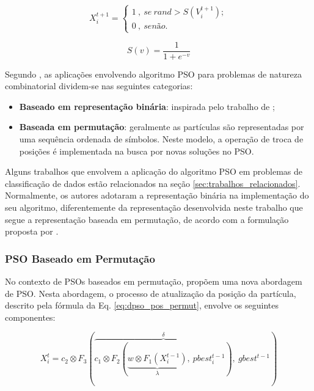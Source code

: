 \documentclass[
	12pt,				%
	openany,			%
	oneside,	
	a4paper,			%
	brazil,				%
	]{unimontes-ppgmsc-abntex2}
\begin{document}
\begin{equation}
\label{eq:dpso_pos_bin}
X^{t+1}_{i} = \left\{\begin{array}{l}
1\ ,\ se\ rand > S(V^{t+1}_{i}); \\
0\ ,\ senão.
\end{array}\right.
\end{equation}

\begin{equation}
\label{eq:dpso_sig}
S(v) = \frac{1}{1 + e^{-v}}
\end{equation}

Segundo , as aplicações envolvendo algoritmo PSO para problemas de natureza combinatorial dividem-se nas seguintes categorias: 

\begin{itemize}
\item \textbf{Baseado em representação binária}: inspirada pelo trabalho de ;
\item \textbf{Baseada em permutação}: geralmente as partículas são representadas por uma sequência ordenada de símbolos. Neste modelo, a operação de troca de posições é implementada na busca por novas soluções no PSO.
\end{itemize}

Alguns trabalhos que envolvem a aplicação do algoritmo PSO em problemas de classificação de dados estão relacionados na seção \ref{sec:trabalhos_relacionados}. Normalmente, os autores adotaram a representação binária na implementação do seu algoritmo, diferentemente da representação desenvolvida neste trabalho que segue a representação baseada em permutação, de acordo com a formulação proposta por .

\subsubsection{PSO Baseado em Permutação}
\label{sec:atual_part}

No contexto de PSOs baseados em permutação,  propõem uma nova abordagem de PSO. Nesta abordagem, o processo de atualização da posição da partícula, descrito pela fórmula da Eq. \ref{eq:dpso_pos_permut}, envolve os seguintes componentes: 

\begin{equation}
\label{eq:dpso_pos_permut}
X^{t}_{i} = c_2 \otimes F_3 (\overbrace{c_1 \otimes F_2 (\underbrace{w \otimes F_1 (X^{t-1}_{i})}_{\lambda},\ pbest^{t-1}_{i})}^{\delta},\ 
gbest^{t-1})
\end{equation}
\end{document}
